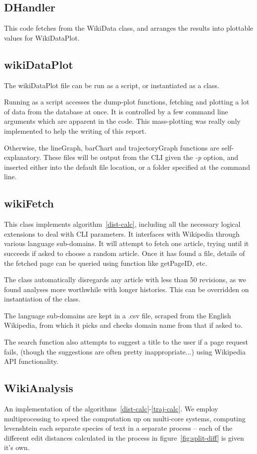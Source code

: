 \subsection*{DHandler}
This code fetches from the WikiData class, and arranges the results
into plottable values for WikiDataPlot.

\subsection*{wikiDataPlot}
The wikiDataPlot file can be run as a script, or instantiated as a
class. 

Running as a script accesses the dump-plot functions, fetching and
plotting a lot of data from the database at once. It is controlled by
a few command line arguments which are apparent in the code. This
mass-plotting was really only implemented to help the writing of this
report.

Otherwise, the lineGraph, barChart and trajectoryGraph functions are
self-explanatory. These files will be output from the CLI given the
\textit{-p} option, and inserted either into the default file
location, or a folder specified at the command line.

\subsection*{wikiFetch}
This class implements algorithm~\ref{dist-calc}, including all the
necessary logical extensions to deal with CLI parameters. It
interfaces with Wikipedia through various language sub-domains. It will
attempt to fetch one article, trying until it succeeds if asked to
choose a random article. Once it has found a file, details of the
fetched page can be queried using function like getPageID, etc.

The class automatically disregards any article with less than 50
revisions, as we found analyses more worthwhile with longer
histories. This can be overridden on instantiation of the class. 

The language sub-domains are kept in a .csv file, scraped from the
English Wikipedia, from which it picks and checks
domain name from that if asked to.

The search function also attempts to suggest a title to the user if a
page request fails, (though the suggestions are often pretty
inappropriate...) using Wikipedia API functionality. 

\subsection*{WikiAnalysis}
An implementation of the
algorithms~\ref{dist-calc}-\ref{traj-calc}. We employ multiprocessing
to speed the computation up on multi-core systems, computing
levenshtein each separate species of text in a separate process --
each of the different edit distances calculated in the process in
figure~\ref{fig:split-diff} is given it's own. 

